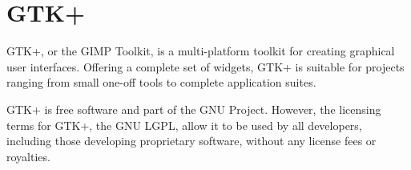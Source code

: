 
\section[GTK+]{GTK+\cite{website:gtk}}\label{sec:GTK}


GTK+, or the GIMP Toolkit, is a multi-platform toolkit for creating graphical user interfaces. Offering a complete set of widgets, GTK+ is suitable for projects ranging from small one-off tools to complete application suites.

GTK+ is free software and part of the GNU Project. However, the licensing terms for GTK+, the GNU LGPL, allow it to be used by all developers, including those developing proprietary software, without any license fees or royalties.


